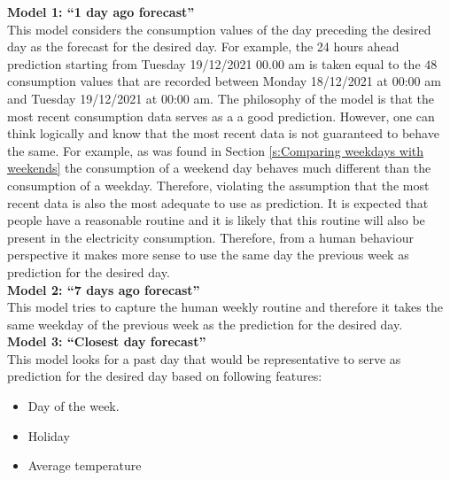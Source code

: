 \textbf{Model 1: ``1 day ago forecast''}\\
This model considers the consumption values of the day preceding the desired day as the forecast for the desired day. For example, the 24 hours ahead prediction starting from Tuesday 19/12/2021 00.00 am is taken equal to the $ 48 $ consumption values that are recorded between Monday 18/12/2021 at 00:00 am and Tuesday 19/12/2021 at 00:00 am. The philosophy of the model is that the most recent consumption data serves as a a good prediction. However, one can think logically and know that the most recent data is not guaranteed to behave the same. For example, as was found in Section \ref{s:Comparing weekdays with weekends} the consumption of a weekend day behaves much different than the consumption of a weekday. Therefore, violating the assumption that the most recent data is also the most adequate to use as prediction. It is expected that people have a reasonable routine and it is likely that this routine will also be present in the electricity consumption. Therefore, from a human behaviour perspective it makes more sense to use the same day the previous week as prediction for the desired day.\\

\textbf{Model 2: ``7 days ago forecast''}\\
This model tries to capture the human weekly routine and therefore it takes the same weekday of the previous week as the prediction for the desired day.\\

\textbf{Model 3: ``Closest day forecast''}\\
This model looks for a past day that would be representative to serve as prediction for the desired day based on following features:

\begin{itemize}
	\item Day of the week.
	\item Holiday
	\item Average temperature
\end{itemize}


